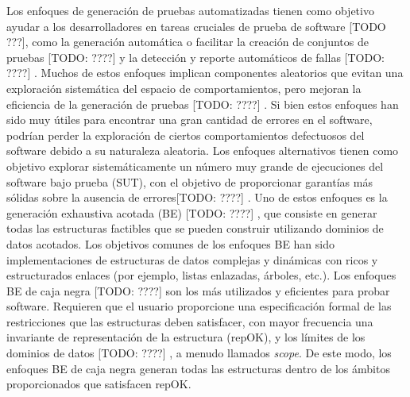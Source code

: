Los enfoques de generación de pruebas automatizadas tienen como objetivo ayudar a los desarrolladores en tareas cruciales de prueba de software [TODO ???], como la generación automática o facilitar la creación de conjuntos de pruebas [TODO: ????] y la detección y reporte automáticos de fallas [TODO: ????] . Muchos de estos enfoques implican componentes aleatorios que evitan una exploración sistemática del espacio de comportamientos, pero mejoran la eficiencia de la generación de pruebas [TODO: ????] . Si bien estos enfoques han sido muy útiles para encontrar una gran cantidad de errores en el software, podrían perder la exploración de ciertos comportamientos defectuosos del software debido a su naturaleza aleatoria. Los enfoques alternativos tienen como objetivo explorar sistemáticamente un número muy grande de ejecuciones del software bajo prueba (SUT), con el objetivo de proporcionar garantías más sólidas sobre la ausencia de errores[TODO: ????] . Uno de estos enfoques es la generación exhaustiva acotada (BE) [TODO: ????] , que consiste en generar todas las estructuras factibles que se pueden construir utilizando dominios de datos acotados. Los objetivos comunes de los enfoques BE han sido implementaciones de estructuras de datos complejas y dinámicas con ricos y estructurados enlaces (por ejemplo, listas enlazadas, árboles, etc.). Los enfoques BE de caja negra [TODO: ????]  son los más utilizados y eficientes para probar software. Requieren que el usuario proporcione una especificación formal de las restricciones que las estructuras deben satisfacer, con mayor frecuencia una invariante de representación de la estructura (repOK), y los límites de los dominios de datos [TODO: ????] , a menudo llamados \emph{scope}. De este modo, los enfoques BE de caja negra generan todas las estructuras dentro de los ámbitos proporcionados que satisfacen repOK.

